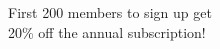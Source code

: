 \documentclass[preview]{standalone}
\begin{document}
\begin{center}
First 200 members to sign up get\\20\% off the annual subscription!
\end{center}
\end{document}
